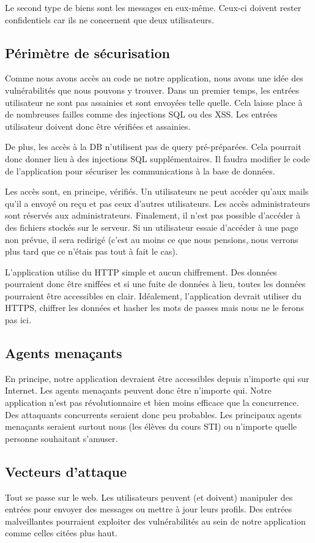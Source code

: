 \documentclass[12pt]{article}
\begin{document}
Le second type de biens sont les messages en eux-même. Ceux-ci doivent rester confidentiels car ils ne concernent que deux utilisateurs.

\subsection{Périmètre de sécurisation}
Comme nous avons accès au code ne notre application, nous avons une idée des vulnérabilités que nous pouvons y trouver. Dans un premier temps, les entrées utilisateur ne sont pas assainies et sont envoyées telle quelle. Cela laisse place à de nombreuses failles comme des injections SQL ou des XSS. Les entrées utilisateur doivent donc être vérifiées et assainies.

De plus, les accès à la DB n'utilisent pas de query pré-préparées. Cela pourrait donc donner lieu à des injections SQL supplémentaires. Il faudra modifier le code de l'application pour sécuriser les communications à la base de données.

Les accès sont, en principe, vérifiés. Un utilisateurs ne peut accéder qu'aux mails qu'il a envoyé ou reçu et pas ceux d'autres utilisateurs. Les accès administrateurs sont réservés aux administrateurs. Finalement, il n'est pas possible d'accéder à des fichiers stockés sur le serveur. Si un utilisateur essaie d'accéder à une page non prévue, il sera redirigé (c'est au moins ce que nous pensions, nous verrons plus tard que ce n'étais pas tout à fait le cas).

L'application utilise du HTTP simple et aucun chiffrement. Des données pourraient donc être sniffées et si une fuite de données à lieu, toutes les données pourraient être accessibles en clair. Idéalement, l'application devrait utiliser du HTTPS, chiffrer les données et hasher les mots de passes mais nous ne le ferons pas ici.

\subsection{Agents menaçants}
En principe, notre application devraient être accessibles depuis n'importe qui sur Internet. Les agents menaçants peuvent donc être n'importe qui. Notre application n'est pas révolutionnaire et bien moins efficace que la concurrence. Des attaquants concurrents seraient donc peu probables. Les principaux agents menaçants seraient surtout nous (les élèves du cours STI) ou n'importe quelle personne souhaitant s'amuser.

\subsection{Vecteurs d'attaque}
Tout se passe sur le web. Les utilisateurs peuvent (et doivent) manipuler des entrées pour envoyer des messages ou mettre à jour leurs profils. Des entrées malveillantes pourraient exploiter des vulnérabilités au sein de notre application comme celles citées plus haut. 
\end{document}

